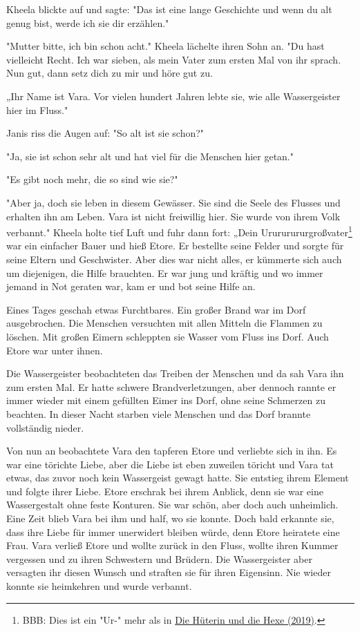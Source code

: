 \documentclass[10pt, a4paper, oneside]{book}
\newcommand{\refstorytext}[1]{\hyperref[Storytext: #1]{#1}}
\begin{document}
\begin{multicols}{2}
Kheela blickte auf und sagte: "Das ist eine lange Geschichte und wenn du alt genug bist, werde ich sie dir erzählen."

"Mutter bitte, ich bin schon acht." Kheela lächelte ihren Sohn an. "Du hast vielleicht Recht. Ich war sieben, als mein Vater zum ersten Mal von ihr sprach. Nun gut, dann setz dich zu mir und höre gut zu.

„Ihr Name ist Vara. Vor vielen hundert Jahren lebte sie, wie alle Wassergeister hier im Fluss."

Janis riss die Augen auf: "So alt ist sie schon?"

"Ja, sie ist schon sehr alt und hat viel für die Menschen hier getan."

"Es gibt noch mehr, die so sind wie sie?"

"Aber ja, doch sie leben in diesem Gewässer. Sie sind die Seele des Flusses und erhalten ihn am Leben. Vara ist nicht freiwillig hier. Sie wurde von ihrem Volk verbannt." Kheela holte tief Luft und fuhr dann fort: „Dein Urururururgroßvater\footnote{BBB: Dies ist ein "Ur-" mehr als in \refstorytext{Die Hüterin und die Hexe (2019)}.} war ein einfacher Bauer und hieß Etore. Er bestellte seine Felder und sorgte für seine Eltern und Geschwister. Aber dies war nicht alles, er kümmerte sich auch um diejenigen, die Hilfe brauchten. Er war jung und kräftig und wo immer jemand in Not geraten war, kam er und bot seine Hilfe an.

Eines Tages geschah etwas Furchtbares. Ein großer Brand war im Dorf ausgebrochen. Die Menschen versuchten mit allen Mitteln die Flammen zu löschen. Mit großen Eimern schleppten sie Wasser vom Fluss ins Dorf. Auch Etore war unter ihnen.\bigskip

Die Wassergeister beobachteten das Treiben der Menschen und da sah Vara ihn zum ersten Mal. Er hatte schwere Brandverletzungen, aber dennoch rannte er immer wieder mit einem gefüllten Eimer ins Dorf, ohne seine Schmerzen zu beachten. In dieser Nacht starben viele Menschen und das Dorf brannte vollständig nieder.

Von nun an beobachtete Vara den tapferen Etore und verliebte sich in ihn. Es war eine törichte Liebe, aber die Liebe ist eben zuweilen töricht und Vara tat etwas, das zuvor noch kein Wassergeist gewagt hatte. Sie entstieg ihrem Element und folgte ihrer Liebe. Etore erschrak bei ihrem Anblick, denn sie war eine Wassergestalt ohne feste Konturen. Sie war schön, aber doch auch unheimlich. Eine Zeit blieb Vara bei ihm und half, wo sie konnte. Doch bald erkannte sie, dass ihre Liebe für immer unerwidert bleiben würde, denn Etore heiratete eine Frau. Vara verließ Etore und wollte zurück in den Fluss, wollte ihren Kummer vergessen und zu ihren Schwestern und Brüdern. Die Wassergeister aber versagten ihr diesen Wunsch und straften sie für ihren Eigensinn. Nie wieder konnte sie heimkehren und wurde verbannt.\bigskip


\end{multicols}
\end{document}

